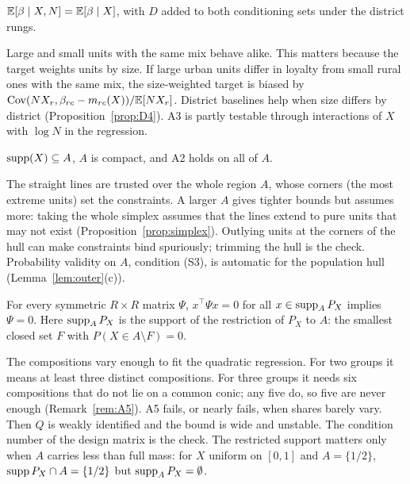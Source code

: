 \begin{assumption}\label{ass:A3}
$\mathbb E[\beta\mid X,N]=\mathbb E[\beta\mid X]$, with $D$ added to both conditioning sets
under the district rungs.
\end{assumption}
\begin{reading}
Large and small units with the same mix behave alike. This matters because the
target weights units by size. If large urban units differ in loyalty from small
rural ones with the same mix, the size-weighted target is biased by
$\operatorname{Cov}(NX_r,\beta_{rc}-m_{rc}(X))/\mathbb E[NX_r]$. District baselines help when size
differs by district (Proposition~\ref{prop:D4}). A3 is partly testable through
interactions of $X$ with $\log N$ in the regression.
\end{reading}

\begin{assumption}\label{ass:A4}
$\operatorname{supp}(X)\subseteq A$, $A$ is compact, and A2 holds on all of $A$.
\end{assumption}
\begin{reading}
The straight lines are trusted over the whole region $A$, whose corners (the
most extreme units) set the constraints. A larger $A$ gives tighter bounds but
assumes more: taking the whole simplex assumes that the lines extend to pure
units that may not exist (Proposition~\ref{prop:simplex}). Outlying units at the
corners of the hull can make constraints bind spuriously; trimming the hull is
the check. Probability validity on $A$, condition (S3), is automatic for the
population hull (Lemma~\ref{lem:outer}(c)).
\end{reading}

\begin{assumption}[A5: rank]\label{ass:A5}
For every symmetric $R\times R$ matrix $\Psi$, $x^\top\Psi x=0$ for all
$x\in\operatorname{supp}_AP_X$ implies $\Psi=0$. Here $\operatorname{supp}_AP_X$ is the support of the
restriction of $P_X$ to $A$: the smallest closed set $F$ with $P(X\in A\setminus F)=0$.
\end{assumption}
\begin{reading}
The compositions vary enough to fit the quadratic regression. For two groups it
means at least three distinct compositions. For three groups it needs six
compositions that do not lie on a common conic; any five do, so five are never
enough (Remark~\ref{rem:A5}). A5 fails, or nearly fails, when shares barely vary.
Then $Q$ is weakly identified and the bound is wide and unstable. The condition
number of the design matrix is the check. The restricted support matters only
when $A$ carries less than full mass: for $X$ uniform on $[0,1]$ and
$A=\{1/2\}$, $\operatorname{supp} P_X\cap A=\{1/2\}$ but $\operatorname{supp}_AP_X=\emptyset$.
\end{reading}

